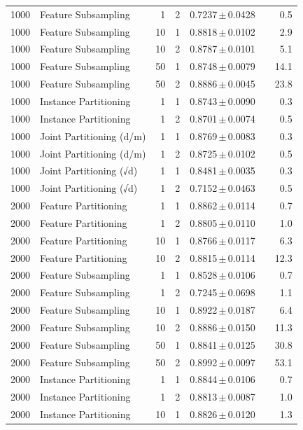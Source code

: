 \begin{table}[ht]
\begin{tabular}{rlrrccr}
1000 & Feature Subsampling & 1 & 2 & 0.7237\,$\pm$\,0.0428 &  & 0.5 \\
1000 & Feature Subsampling & 10 & 1 & 0.8818\,$\pm$\,0.0102 &  & 2.9 \\
1000 & Feature Subsampling & 10 & 2 & 0.8787\,$\pm$\,0.0101 &  & 5.1 \\
1000 & Feature Subsampling & 50 & 1 & 0.8748\,$\pm$\,0.0079 &  & 14.1 \\
1000 & Feature Subsampling & 50 & 2 & 0.8886\,$\pm$\,0.0045 &  & 23.8 \\
1000 & Instance Partitioning & 1 & 1 & 0.8743\,$\pm$\,0.0090 &  & 0.3 \\
1000 & Instance Partitioning & 1 & 2 & 0.8701\,$\pm$\,0.0074 &  & 0.5 \\
1000 & Joint Partitioning (d/m) & 1 & 1 & 0.8769\,$\pm$\,0.0083 &  & 0.3 \\
1000 & Joint Partitioning (d/m) & 1 & 2 & 0.8725\,$\pm$\,0.0102 &  & 0.5 \\
1000 & Joint Partitioning (√d) & 1 & 1 & 0.8481\,$\pm$\,0.0035 &  & 0.3 \\
1000 & Joint Partitioning (√d) & 1 & 2 & 0.7152\,$\pm$\,0.0463 &  & 0.5 \\
2000 & Feature Partitioning & 1 & 1 & 0.8862\,$\pm$\,0.0114 &  & 0.7 \\
2000 & Feature Partitioning & 1 & 2 & 0.8805\,$\pm$\,0.0110 &  & 1.0 \\
2000 & Feature Partitioning & 10 & 1 & 0.8766\,$\pm$\,0.0117 &  & 6.3 \\
2000 & Feature Partitioning & 10 & 2 & 0.8815\,$\pm$\,0.0114 &  & 12.3 \\
2000 & Feature Subsampling & 1 & 1 & 0.8528\,$\pm$\,0.0106 &  & 0.7 \\
2000 & Feature Subsampling & 1 & 2 & 0.7245\,$\pm$\,0.0698 &  & 1.1 \\
2000 & Feature Subsampling & 10 & 1 & 0.8922\,$\pm$\,0.0187 &  & 6.4 \\
2000 & Feature Subsampling & 10 & 2 & 0.8886\,$\pm$\,0.0150 &  & 11.3 \\
2000 & Feature Subsampling & 50 & 1 & 0.8841\,$\pm$\,0.0125 &  & 30.8 \\
2000 & Feature Subsampling & 50 & 2 & 0.8992\,$\pm$\,0.0097 &  & 53.1 \\
2000 & Instance Partitioning & 1 & 1 & 0.8844\,$\pm$\,0.0106 &  & 0.7 \\
2000 & Instance Partitioning & 1 & 2 & 0.8813\,$\pm$\,0.0087 &  & 1.0 \\
2000 & Instance Partitioning & 10 & 1 & 0.8826\,$\pm$\,0.0120 &  & 1.3 \\

\end{tabular}
\end{table}
